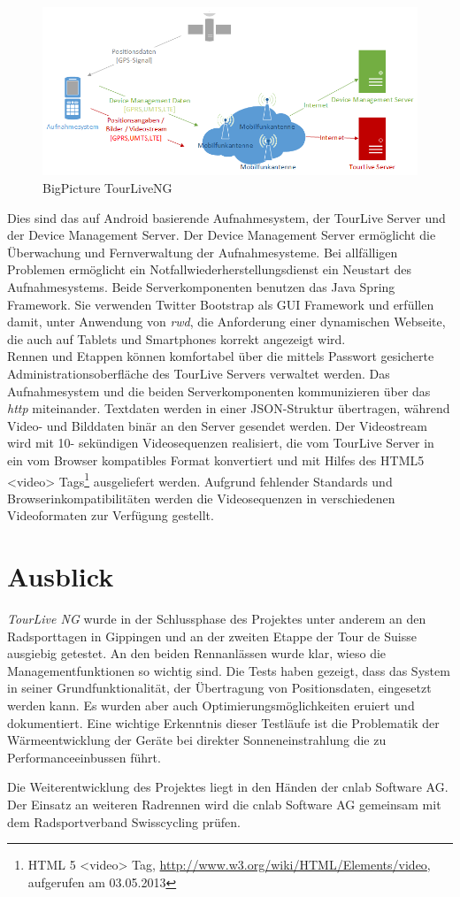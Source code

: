 \begin{figure}[H]
	\centering
	\includegraphics[width=140mm]{images/android/BigPicture_AndroidClient.png} 
	\caption{BigPicture TourLiveNG}
	\label{fig:bigpictureandroid}
\end{figure}
Dies sind das auf Android basierende Aufnahmesystem, der TourLive Server und der Device Management Server. Der Device Management Server ermöglicht die Überwachung und Fernverwaltung der Aufnahmesysteme. Bei allfälligen Problemen ermöglicht ein Notfallwiederherstellungsdienst ein Neustart des Aufnahmesystems. Beide Serverkomponenten benutzen das  Java Spring Framework. Sie verwenden Twitter Bootstrap als GUI Framework und erfüllen damit, unter Anwendung von \textit{\gls{rwd}}, die Anforderung einer dynamischen Webseite, die auch auf Tablets und Smartphones korrekt angezeigt wird. 
\\

Rennen und Etappen können komfortabel über die mittels Passwort gesicherte Administrationsoberfläche des TourLive Servers verwaltet werden. Das Aufnahmesystem und die beiden Serverkomponenten kommunizieren über das \textit{\gls{http}} miteinander. Textdaten werden in einer JSON-Struktur übertragen, während Video- und Bilddaten binär an den Server gesendet  werden. Der Videostream wird mit 10- sekündigen Videosequenzen realisiert, die vom TourLive Server in ein vom Browser kompatibles Format konvertiert und mit Hilfes des HTML5 <video> Tags\footnote{HTML 5 <video> Tag,  \url{http://www.w3.org/wiki/HTML/Elements/video}, aufgerufen am 03.05.2013} ausgeliefert werden. Aufgrund fehlender Standards und Browserinkompatibilitäten werden die Videosequenzen in verschiedenen Videoformaten zur Verfügung gestellt.


\section*{Ausblick}
\textit{TourLive NG} wurde in der Schlussphase des Projektes unter anderem an den Radsporttagen in Gippingen und an der zweiten Etappe der Tour de Suisse ausgiebig getestet. An den beiden Rennanlässen wurde klar, wieso die Managementfunktionen so wichtig sind. Die Tests haben gezeigt, dass das System in seiner Grundfunktionalität, der Übertragung von Positionsdaten, eingesetzt werden kann. Es wurden aber auch Optimierungsmöglichkeiten eruiert und dokumentiert. Eine wichtige Erkenntnis dieser Testläufe ist die Problematik der Wärmeentwicklung der Geräte bei direkter Sonneneinstrahlung die zu Performanceeinbussen führt.

Die Weiterentwicklung des Projektes liegt in den Händen der cnlab Software AG. Der Einsatz an weiteren Radrennen wird die cnlab Software AG gemeinsam mit dem Radsportverband Swisscycling prüfen.

